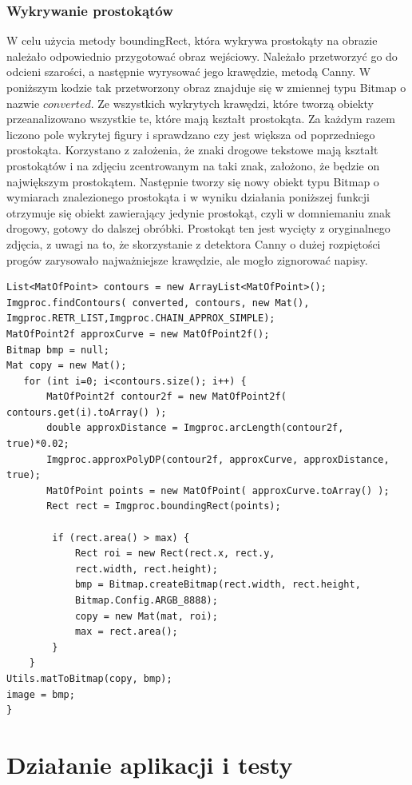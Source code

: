 \documentclass[eng,oneside]{mgr}
\begin{document}
\subsection{Wykrywanie prostokątów}
W celu użycia metody boundingRect, która wykrywa prostokąty na obrazie należało odpowiednio przygotować obraz wejściowy. Należało przetworzyć go do odcieni szarości, a następnie wyrysować jego krawędzie, metodą Canny. W poniższym kodzie tak przetworzony obraz znajduje się w zmiennej typu Bitmap o nazwie $converted$. Ze wszystkich wykrytych krawędzi, które tworzą obiekty przeanalizowano wszystkie te, które mają kształt prostokąta. Za każdym razem liczono pole wykrytej figury i sprawdzano czy jest większa od poprzedniego prostokąta. Korzystano z założenia, że znaki drogowe tekstowe mają kształt prostokątów i na zdjęciu zcentrowanym na taki znak, założono, że będzie on największym prostokątem. Następnie tworzy się nowy obiekt typu Bitmap o wymiarach znalezionego prostokąta i w wyniku działania poniższej funkcji otrzymuje się obiekt zawierający jedynie prostokąt, czyli w domniemaniu znak drogowy, gotowy do dalszej obróbki. Prostokąt ten jest wycięty z oryginalnego zdjęcia, z uwagi na to, że skorzystanie z detektora Canny o dużej rozpiętości progów zarysowało najważniejsze krawędzie, ale mogło zignorować napisy.
\begin{lstlisting}[caption={Kod programu, odpowiadający za wykrycie prostokątów przy użyciu biblioteki Open CV}]
List<MatOfPoint> contours = new ArrayList<MatOfPoint>();
Imgproc.findContours( converted, contours, new Mat(), Imgproc.RETR_LIST,Imgproc.CHAIN_APPROX_SIMPLE);
MatOfPoint2f approxCurve = new MatOfPoint2f();
Bitmap bmp = null;
Mat copy = new Mat();
   for (int i=0; i<contours.size(); i++) {
       MatOfPoint2f contour2f = new MatOfPoint2f( 			 contours.get(i).toArray() );
       double approxDistance = Imgproc.arcLength(contour2f, true)*0.02;
       Imgproc.approxPolyDP(contour2f, approxCurve, approxDistance, true);
       MatOfPoint points = new MatOfPoint( approxCurve.toArray() );
       Rect rect = Imgproc.boundingRect(points);

		if (rect.area() > max) {
	   		Rect roi = new Rect(rect.x, rect.y, 
	   		rect.width, rect.height);
    		bmp = Bitmap.createBitmap(rect.width, rect.height, 	
    		Bitmap.Config.ARGB_8888);
    		copy = new Mat(mat, roi);
			max = rect.area();
        }
    }
Utils.matToBitmap(copy, bmp);
image = bmp;
}
\end{lstlisting}

\chapter{Działanie aplikacji i testy}
\end{document}

